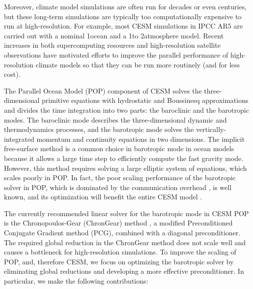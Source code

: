 Moreover, climate model simulations are often run for decades or
even centuries, but these long-term simulations are typically too
computationally expensive to run at high-resolution.  For example,
most CESM simulations in IPCC AR5 are carried out with a nominal
1\degree\space ocean and a 1\degree\space to 2\degree\space atmosphere model.
Recent increases in both supercomputing resources and
high-resolution satellite observations have motivated
efforts to improve the parallel performance of high-resolution climate
models so that they can be run more routinely (and for less cost).


The Parallel Ocean Model (POP) component of CESM solves the
three-dimensional primitive equations with hydrostatic and Boussinesq
approximations \cite{smith2010parallel} and divides the time
integration into two parts: the baroclinic and the
barotropic modes. The baroclinic mode describes the 
three-dimensional dynamic and thermodynamics processes, and the barotropic
mode solves the vertically-integrated momentum and continuity
equations in two dimensions. The implicit free-surface method is a common choice
in barotropic mode in ocean models because it allows a large time step to
efficiently compute the fast gravity mode.  However, this method
requires solving a large elliptic system of equations, which
scales poorly in POP.  In fact, the poor scaling performance of the
barotropic solver in POP, which is dominated by the communication
overhead \cite{Worley:2011:PCE:2063384.2063457}, is well known, and
its optimization will benefit the entire CESM model
\cite{dennis2012computational}.

The currently recommended linear solver for the barotropic mode in CESM
POP is the Chronopoulos-Gear (ChronGear) method
\cite{dAzevedo1999lapack}, a modified Preconditioned Conjugate
Gradient method (PCG), combined with a diagonal preconditioner.
The required global reduction in the ChronGear method does not scale well and
causes a bottleneck for high-resolution simulations.  To improve the scaling
of POP, and, therefore CESM, we focus on optimizing the barotropic
solver by eliminating global reductions and developing a more
effective preconditioner.  In particular, we make the following
contributions:



